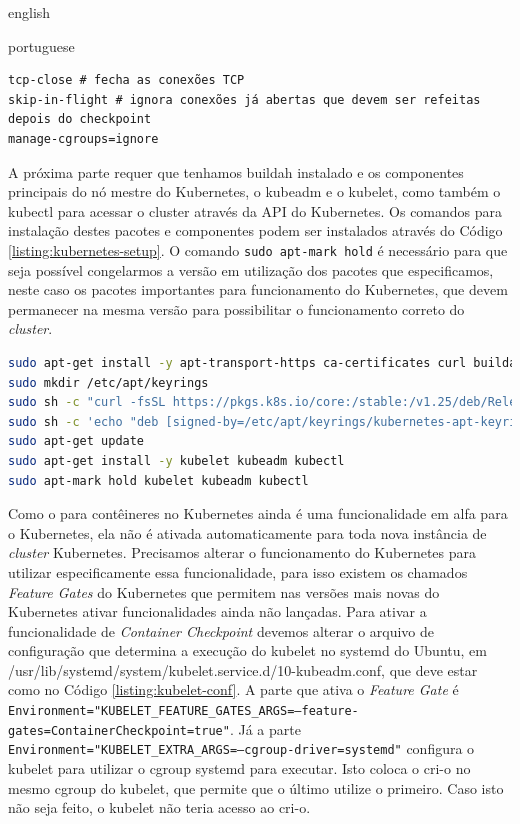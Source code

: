 \begin{otherlanguage*}{english}
\begin{otherlanguage*}{portuguese}
\begin{lstlisting}[language=plaintext,caption={Configuração a ser incluída no arquivo de configurações do runc para o CRIU.},label={listing:runc-conf}]
tcp-close # fecha as conexões TCP
skip-in-flight # ignora conexões já abertas que devem ser refeitas depois do checkpoint
manage-cgroups=ignore
\end{lstlisting}

A próxima parte requer que tenhamos buildah instalado e os componentes principais do nó
mestre do Kubernetes, o kubeadm e o kubelet, como também o kubectl para acessar o cluster
através da  API do Kubernetes. Os comandos para instalação destes pacotes e componentes podem
ser instalados através do Código \ref{listing:kubernetes-setup}. O comando \texttt{sudo apt-mark hold}
é necessário para que seja possível congelarmos a versão em utilização dos pacotes que especificamos,
neste caso os pacotes importantes para funcionamento do Kubernetes, que devem permanecer na mesma
versão para possibilitar o funcionamento correto do \textit{cluster}.

\begin{lstlisting}[language=bash,caption={Instalação dos pacotes necessários para Kubernetes e buildah.},label={listing:kubernetes-setup}]
sudo apt-get install -y apt-transport-https ca-certificates curl buildah make
sudo mkdir /etc/apt/keyrings
sudo sh -c "curl -fsSL https://pkgs.k8s.io/core:/stable:/v1.25/deb/Release.key | gpg --dearmor -o /etc/apt/keyrings/kubernetes-apt-keyring.gpg"
sudo sh -c 'echo "deb [signed-by=/etc/apt/keyrings/kubernetes-apt-keyring.gpg] https://pkgs.k8s.io/core:/stable:/v1.25/deb/ /" | tee /etc/apt/sources.list.d/kubernetes.list'
sudo apt-get update
sudo apt-get install -y kubelet kubeadm kubectl
sudo apt-mark hold kubelet kubeadm kubectl
\end{lstlisting}

Como o  para contêineres no Kubernetes ainda é uma funcionalidade em alfa para
o Kubernetes, ela não é ativada automaticamente para toda nova instância de \textit{cluster}
Kubernetes. Precisamos alterar o funcionamento do Kubernetes para utilizar especificamente essa
funcionalidade, para isso existem os chamados \textit{Feature Gates} do Kubernetes que permitem
nas versões mais novas do Kubernetes ativar funcionalidades ainda não lançadas. Para ativar a
funcionalidade de \textit{Container Checkpoint} devemos alterar o arquivo de configuração que
determina a execução do kubelet no systemd do Ubuntu, em
/usr/lib/systemd/system/kubelet.service.d/10-kubeadm.conf, que deve estar como no
Código \ref{listing:kubelet-conf}. A parte que ativa o \textit{Feature Gate} é
\texttt{Environment="KUBELET\_FEATURE\_GATES\_ARGS=--feature-gates=ContainerCheckpoint=true"}. Já
a parte \texttt{Environment="KUBELET\_EXTRA\_ARGS=--cgroup-driver=systemd"} configura o kubelet
para utilizar o cgroup systemd para executar. Isto coloca o cri-o no mesmo cgroup do kubelet, 
que permite que o último utilize o primeiro. Caso isto não seja feito, o kubelet não teria acesso
ao cri-o.


\end{otherlanguage*}
\end{otherlanguage*}
